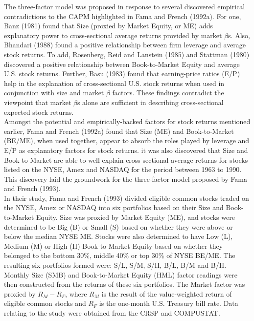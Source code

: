\documentclass[12pt]{article}
\begin{document}
	\noindent The three-factor model was proposed in response to several discovered empirical contradictions to the CAPM highlighted in Fama and French (1992a). For one, Banz (1981) found that Size (proxied by Market Equity, or ME) adds explanatory power to cross-sectional average returns provided by market $\beta$s. Also, Bhandari (1988) found a positive relationship between firm leverage and average stock returns. To add, Rosenberg, Reid and Lanstein (1985) and Stattman (1980) discovered a positive relationship between Book-to-Market Equity and average U.S. stock returns. Further, Basu (1983) found that earning-price ratios (E/P) help in the explanation of cross-sectional U.S. stock returns when used in conjunction with size and market $\beta$ factors. These findings contradict the viewpoint that market $\beta$s alone are sufficient in describing cross-sectional expected stock returns. \\
	
	\noindent Amongst the potential and empirically-backed factors for stock returns mentioned earlier, Fama and French (1992a) found that Size (ME) and Book-to-Market (BE/ME), when used together, appear to absorb the roles played by leverage and E/P as explanatory factors for stock returns. it was also discovered that Size and Book-to-Market are able to well-explain cross-sectional average returns for stocks listed on the NYSE, Amex and NASDAQ for the period between 1963 to 1990. This discovery laid the groundwork for the three-factor model proposed by Fama and French (1993).\\
	
	\noindent In their study, Fama and French (1993) divided eligible common stocks traded on the NYSE, Amex or NASDAQ into six portfolios based on their Size and Book-to-Market Equity. Size was proxied by Market Equity (ME), and stocks were determined to be Big (B) or Small (S) based on whether they were above or below the median NYSE ME. Stocks were also determined to have Low (L), Medium (M) or High (H) Book-to-Market Equity based on whether they belonged to the bottom 30\%, middle 40\% or top 30\% of NYSE BE/ME. The resulting six portfolios formed were: S/L, S/M, S/H, B/L, B/M and B/H. Monthly Size (SMB) and Book-to-Market Equity (HML) factor readings were then constructed from the returns of these six portfolios. The Market factor was proxied by $R_M - R_F$, where $R_M$ is the result of the value-weighted return of eligible common stocks and $R_F$ is the one-month U.S. Treasury bill rate. Data relating to the study were obtained from the CRSP and COMPUSTAT.\\
	
\end{document}
